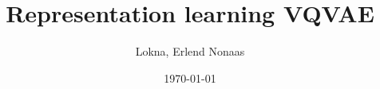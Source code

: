 
\author{Lokna, Erlend Nonaas}


\newif\ifSINGLESUPERVISOR
\SINGLESUPERVISORfalse  %

\ifSINGLESUPERVISOR
    \newcommand{\supervisorGrammar}{Supervisor}
    \newcommand{\supervisor_A}{Grepstad, Sigrid}
\else
    \newcommand{\supervisorGrammar}{Supervisors}
    \newcommand{\supervisorA}{Grepstad, Sigrid}
    \newcommand{\supervisorB}{Heap, Winston}  %
\fi


\title{Representation learning VQVAE}


\newcommand{\emnekode}{MA3911 — masteroppgave i matematiske fag}


\renewcommand{\NTNUinstitutt}{Institute of Mathematical Sciences}
\renewcommand{\NTNUinstituttLowerC}{institute of mathematical sciences}


\date{\today}
